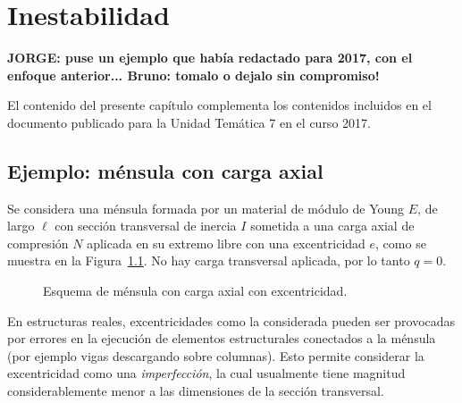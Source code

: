 %
%
%

\chapter{Inestabilidad}

\textbf{JORGE: puse un ejemplo que había redactado para 2017, con el enfoque anterior... Bruno: tomalo o dejalo sin compromiso!}


El contenido del presente capítulo complementa los contenidos incluidos en el documento publicado para la Unidad Temática 7 en el curso 2017.
 
\section{Ejemplo: ménsula con carga axial}

Se considera una ménsula formada por un material de módulo de Young $E$, de largo $\ell$ con sección transversal de inercia $I$ sometida a una carga axial de compresión $N$ aplicada en su extremo libre con una excentricidad $e$, como se muestra en la Figura~\ref{fig:esqpand}. %
%
No hay carga transversal aplicada, por lo tanto $q=0$. %

\begin{figure}[htb]
\centering
\def\svgwidth{0.5\textwidth}

\caption{Esquema de ménsula con carga axial con excentricidad.}
\label{fig:esqpand}
\end{figure}

En estructuras reales, excentricidades como la considerada pueden ser provocadas por errores en la ejecución de elementos estructurales conectados a la ménsula (por ejemplo vigas descargando sobre columnas). %
%
Esto permite considerar la excentricidad como una \textit{imperfección}, la cual usualmente tiene magnitud considerablemente menor a las dimensiones de la sección transversal. %


